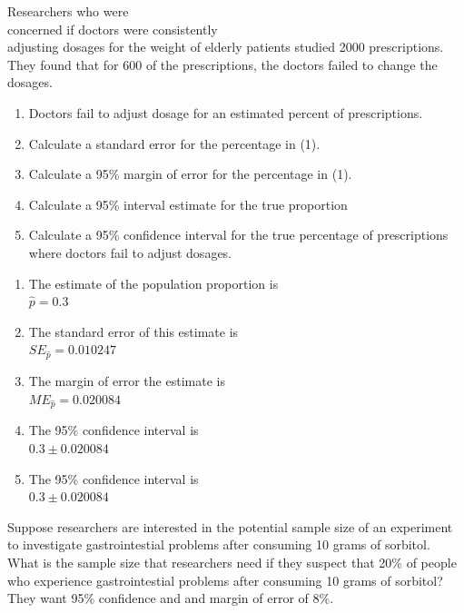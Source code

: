 \documentclass[11pt, chapterprefix=true]{scrbook}\usepackage[]{graphicx}\usepackage[]{color}
\begin{document}
\begin{exercises}
\begin{exercise} %

Researchers who were \\ concerned if doctors were consistently \\ adjusting dosages for the weight of elderly patients studied 2000 prescriptions.  \\ They found that for 600 of the  prescriptions, the doctors failed to change the  dosages.

\begin{enumerate}
\item	Doctors fail to adjust dosage for an estimated \underline{\phantom{xxxxxxxx}}  percent of prescriptions.
\item	Calculate a standard error for the percentage in (1).
\item	Calculate a 95\% margin of error for the percentage in (1).
\item	Calculate a 95\% interval estimate for the true proportion
\item	Calculate a 95\% confidence interval for the true percentage of prescriptions  \\ where doctors fail to adjust dosages.
\end{enumerate}
\end{exercise}
\begin{solution} %


\begin{enumerate}
\item	The estimate of the population proportion is \\ $\hat{p} = 0.3$
\item	The standard error of this estimate is \\ $SE_{\hat{p}} = 0.010247$
\item The margin of error the estimate is \\ $ME_{\hat{p}} = 0.020084$
\item	The 95\% confidence interval is \\ $0.3 \pm 0.020084$
\item	The 95\% confidence interval is \\ $0.3 \pm 0.020084$
\end{enumerate}
\end{solution}

\begin{exercise} %

Suppose researchers are interested in the potential sample size of an experiment to investigate gastrointestial problems after consuming 10 grams of sorbitol.  What is the sample size that researchers need if they suspect that 20\% of people who experience gastrointestial problems after consuming 10 grams of sorbitol?  They want 95\% confidence and and margin of error of 8\%.


\end{exercise}
\end{exercises}
\end{document}
